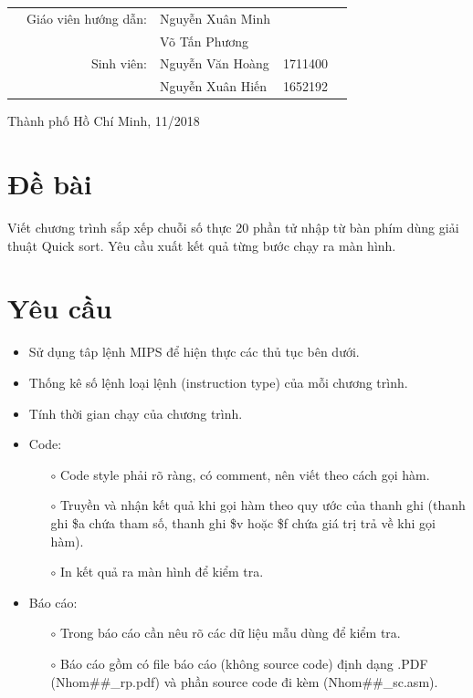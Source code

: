 \documentclass[a4paper]{article}
\begin{document}
\begin{titlepage}
		
		
		\begin{table}[h]
			\begin{tabular}{rrlrr}
				\hspace{3cm}
				& {\large Giáo viên hướng dẫn}: & {\large Nguyễn Xuân Minh}   &         & \\
				& {}							& {\large Võ Tấn Phương}   &         & \\
				& {\large Sinh viên}:           & {\large Nguyễn Văn Hoàng} & 1711400 & \\
				& {}                            & {\large Nguyễn Xuân Hiến } & 1652192 & \\
			\end{tabular}
		\end{table}
		
		\vspace{2cm}
		
		\begin{center}
			{\footnotesize Thành phố Hồ Chí Minh, 11/2018}
		\end{center}
		
	\end{titlepage}

\newpage
\thispagestyle{empty}
\tableofcontents

\newpage

\section{Đề bài}
Viết chương trình sắp xếp chuỗi số thực 20 phần tử nhập từ bàn phím dùng giải thuật Quick sort. Yêu cầu xuất kết quả từng bước chạy ra màn hình.
\section{Yêu cầu}
\begin{itemize}
	\item Sử dụng tâp lệnh MIPS để hiện thực các thủ tục bên dưới.
	\item Thống kê số lệnh loại lệnh (instruction type) của mỗi chương trình.
	\item Tính thời gian chạy của chương trình.
	\item Code:
	\begin{itemize}
		\item [$\circ$] Code style phải rõ ràng, có comment, nên viết theo cách gọi hàm.
		\item [$\circ$] Truyền và nhận kết quả khi gọi hàm theo quy ước của thanh ghi (thanh ghi \$a chứa tham số, thanh ghi \$v hoặc \$f chứa giá trị trả về khi gọi hàm).
		\item [$\circ$] In kết quả ra màn hình để kiểm tra.
	\end{itemize}
	\item Báo cáo:
	\begin{itemize}
		\item [$\circ$] Trong báo cáo cần nêu rõ các dữ liệu mẫu dùng để kiểm tra.
		\item [$\circ$] Báo cáo gồm có file báo cáo (không source code) định dạng .PDF (Nhom\#\#\_rp.pdf) và phần source code đi kèm (Nhom\#\#\_sc.asm).
	\end{itemize}
\end{itemize}
\end{document}
